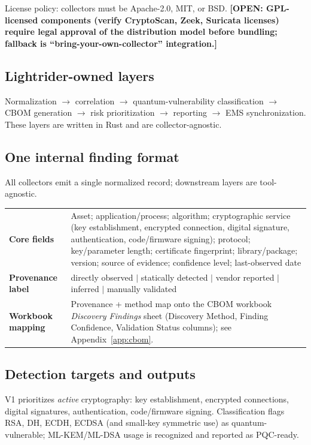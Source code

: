\documentclass[10pt]{article}
\newcommand{\open}[1]{\textcolor{fipsgold}{\sffamily\bfseries\small [OPEN: #1]}}
\begin{document}
License policy: collectors must be Apache-2.0, MIT, or BSD. \open{GPL-licensed components
(verify CryptoScan, Zeek, Suricata licenses) require legal approval of the distribution
model before bundling; fallback is ``bring-your-own-collector'' integration.}

\subsection{Lightrider-owned layers}
Normalization $\rightarrow$ correlation $\rightarrow$ quantum-vulnerability classification
$\rightarrow$ CBOM generation $\rightarrow$ risk prioritization $\rightarrow$ reporting
$\rightarrow$ EMS synchronization. These layers are written in Rust and are
collector-agnostic.

\subsection{One internal finding format}
All collectors emit a single normalized record; downstream layers are tool-agnostic.

\begin{small}
\begin{tabularx}{\textwidth}{@{}lL@{}}
\toprule
\textbf{Core fields} & Asset; application/process; algorithm; cryptographic service
  (key establishment, encrypted connection, digital signature, authentication,
  code/firmware signing); protocol; key/parameter length; certificate fingerprint;
  library/package; version; source of evidence; confidence level; last-observed date \\
\textbf{Provenance label} & directly observed $\mid$ statically detected $\mid$ vendor
  reported $\mid$ inferred $\mid$ manually validated \\
\textbf{Workbook mapping} & Provenance + method map onto the CBOM workbook
  \emph{Discovery Findings} sheet (Discovery Method, Finding Confidence, Validation
  Status columns); see Appendix~\ref{app:cbom}. \\
\bottomrule
\end{tabularx}
\end{small}

\subsection{Detection targets and outputs}
V1 prioritizes \emph{active} cryptography: key establishment, encrypted connections,
digital signatures, authentication, code/firmware signing. Classification flags RSA, DH,
ECDH, ECDSA (and small-key symmetric use) as quantum-vulnerable; ML-KEM/ML-DSA usage is
recognized and reported as PQC-ready.
\end{document}
